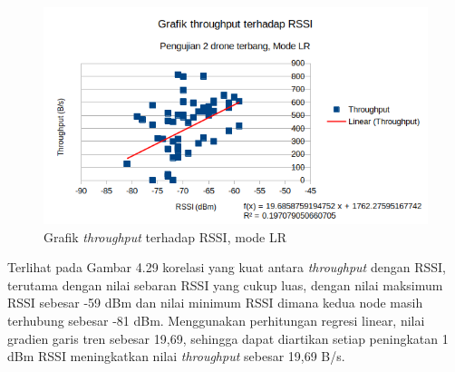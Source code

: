 \begin{figure}[H]
	\centering
	\includegraphics[scale=0.7]{./assets/Graphs/2Fly/Throughput-RSSI}
	\caption{Grafik \textit{throughput} terhadap RSSI, mode LR}
\end{figure}
Terlihat pada Gambar 4.29 korelasi yang kuat antara \textit{throughput} dengan RSSI, terutama dengan nilai sebaran RSSI yang cukup luas, dengan nilai maksimum RSSI sebesar -59 dBm dan nilai minimum RSSI dimana kedua node masih terhubung sebesar -81 dBm. Menggunakan perhitungan regresi linear, nilai gradien garis tren sebesar 19,69, sehingga dapat diartikan setiap peningkatan 1 dBm RSSI meningkatkan nilai \textit{throughput} sebesar 19,69 B/s.

